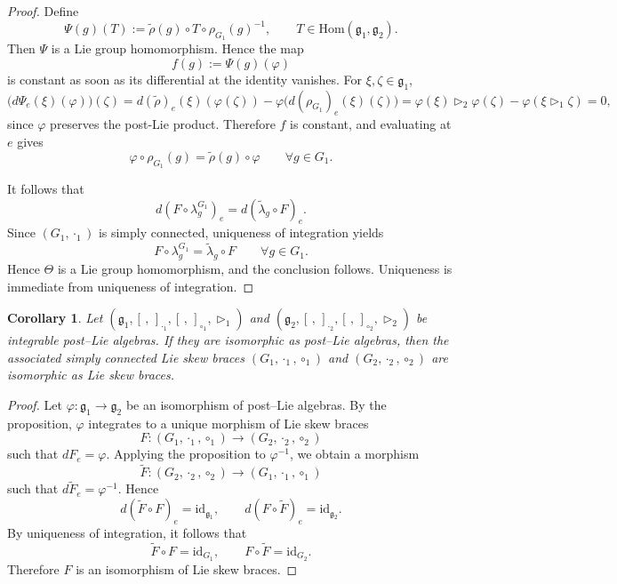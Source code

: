 \documentclass[reqno]{amsart}
\newtheorem{corollary}[theorem]{Corollary}
\begin{document}
\begin{proof}
Define
\[
\Psi(g)(T):=\widetilde{\rho}(g)\circ T\circ \rho_{G_1}(g)^{-1},
\qquad
T\in \mathrm{Hom}(\mathfrak g_1,\mathfrak g_2).
\]
Then $\Psi$ is a Lie group homomorphism. Hence the map
\[
f(g):=\Psi(g)(\varphi)
\]
is constant as soon as its differential at the identity vanishes. For $\xi,\zeta\in \mathfrak g_1$,
\[
\bigl(d\Psi_e(\xi)(\varphi)\bigr)(\zeta)
=
d(\widetilde{\rho})_e(\xi)(\varphi(\zeta))
-
\varphi\bigl(d(\rho_{G_1})_e(\xi)(\zeta)\bigr)
=
\varphi(\xi)\triangleright_2 \varphi(\zeta)-\varphi(\xi\triangleright_1 \zeta)=0,
\]
since $\varphi$ preserves the post-Lie product. Therefore $f$ is constant, and evaluating at $e$
gives
\[
\varphi\circ \rho_{G_1}(g)=\widetilde{\rho}(g)\circ \varphi
\qquad\forall g\in G_1.
\]

It follows that
\[
d(F\circ \lambda^{G_1}_g)_e=d(\widetilde{\lambda}_g\circ F)_e.
\]
Since $(G_1,\cdot_1)$ is simply connected, uniqueness of integration yields
\[
F\circ \lambda^{G_1}_g=\widetilde{\lambda}_g\circ F
\qquad\forall g\in G_1.
\]
Hence $\Theta$ is a Lie group homomorphism, and the conclusion follows.
Uniqueness is immediate from uniqueness of integration.
\end{proof}
\begin{corollary}
Let
$(\mathfrak g_1,[\, ,\,]_{\cdot_1},[\, ,\,]_{\circ_1},\triangleright_1)$
and
$(\mathfrak g_2,[\, ,\,]_{\cdot_2},[\, ,\,]_{\circ_2},\triangleright_2)$
be integrable post--Lie algebras. If they are isomorphic as post--Lie algebras, then the associated simply connected Lie skew braces
$(G_1,\cdot_1,\circ_1)$ and  $(G_2,\cdot_2,\circ_2)$
are isomorphic as Lie skew braces.
\end{corollary}

\begin{proof}
Let
$\varphi:\mathfrak g_1 \longrightarrow \mathfrak g_2$
be an isomorphism of post--Lie algebras. By the proposition, $\varphi$ integrates to a unique morphism of Lie skew braces
\[
F:(G_1,\cdot_1,\circ_1)\longrightarrow (G_2,\cdot_2,\circ_2)
\]
such that $dF_e=\varphi$. Applying the proposition to $\varphi^{-1}$, we obtain a morphism
\[
\widetilde F:(G_2,\cdot_2,\circ_2)\longrightarrow (G_1,\cdot_1,\circ_1)
\]
such that $d\widetilde F_e=\varphi^{-1}$. Hence
\[
d(\widetilde F\circ F)_e=\mathrm{id}_{\mathfrak g_1},
\qquad
d(F\circ \widetilde F)_e=\mathrm{id}_{\mathfrak g_2}.
\]
By uniqueness of integration, it follows that
\[
\widetilde F\circ F=\mathrm{id}_{G_1},
\qquad
F\circ \widetilde F=\mathrm{id}_{G_2}.
\]
Therefore $F$ is an isomorphism of Lie skew braces.
\end{proof}
\end{document}
